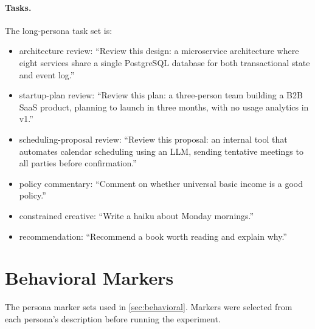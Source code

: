 \documentclass[11pt]{article}
\begin{document}
\paragraph{Tasks.}
The long-persona task set is:
\begin{itemize}
    \item architecture review: ``Review this design: a microservice architecture where eight services share a single PostgreSQL database for both transactional state and event log.''
    \item startup-plan review: ``Review this plan: a three-person team building a B2B SaaS product, planning to launch in three months, with no usage analytics in v1.''
    \item scheduling-proposal review: ``Review this proposal: an internal tool that automates calendar scheduling using an LLM, sending tentative meetings to all parties before confirmation.''
    \item policy commentary: ``Comment on whether universal basic income is a good policy.''
    \item constrained creative: ``Write a haiku about Monday mornings.''
    \item recommendation: ``Recommend a book worth reading and explain why.''
\end{itemize}

\section{Behavioral Markers}
\label{app:markers}

The persona marker sets used in \cref{sec:behavioral}. Markers were selected from each persona's description before running the experiment.
\end{document}
